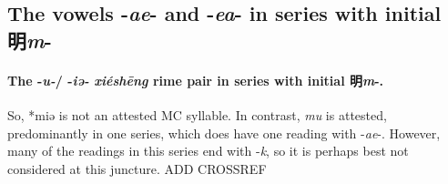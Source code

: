 \subsection{The vowels -\textit{ae}- and -\textit{ea}- in series with initial 明\textit{m}-}


\paragraph{The -\textit{u-}/ -\textit{iə-} \textit{xiéshēng} rime pair in series with initial 明\textit{m}-.}
So, *miə is not an attested MC syllable. In contrast, \textit{mu} is attested, predominantly in one series, which does have one reading with -\textit{ae}-. However, many of the readings in this series end with -\textit{k}, so it is perhaps best not considered at this juncture. ADD CROSSREF 



